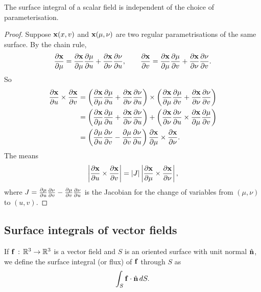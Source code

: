 \documentclass[10pt, a4paper]{article}
\begin{document}
\begin{proposition}\label{prep:mathmethII:prop:surfintscfldindpparam}
    The surface integral of a scalar field is independent of the choice of parameterisation.

    \begin{proof}
        Suppose $\mbf{x}(x, v)$ and $\mbf{x}(\mu, \nu)$ are two regular parametrisations of the same surface.
        By the chain rule,
        \[
        \frac{\partial \mbf{x}}{\partial \mu} = \frac{\partial\mbf{x}}{\partial \mu}\frac{\partial \mu}{\partial u} + \frac{\partial\mbf{x}}{\partial \nu}\frac{\partial \nu}{\partial u}, \qquad \frac{\partial\mbf{x}}{\partial v} = \frac{\partial \mbf{x}}{\partial \mu}\frac{\partial\mu}{\partial v} + \frac{\partial \mbf{x}}{\partial \nu}\frac{\partial \nu}{\partial v}.
        \]
        So
        \begin{align*}
            \frac{\partial\mbf{x}}{\partial u} \times \pd[\mbf{x}]{v} &= \left(\frac{\partial\mbf{x}}{\partial \mu}\frac{\partial \mu}{\partial u} + \frac{\partial\mbf{x}}{\partial \nu}\frac{\partial \nu}{\partial u}\right) \times \left(\frac{\partial \mbf{x}}{\partial \mu}\frac{\partial\mu}{\partial v} + \frac{\partial \mbf{x}}{\partial \nu}\frac{\partial \nu}{\partial v}\right) \\
            &= \left(\frac{\partial\mbf{x}}{\partial \mu}\frac{\partial \mu}{\partial u} + \frac{\partial\mbf{x}}{\partial \nu}\frac{\partial \nu}{\partial u}\right) + \left(\frac{\partial \mbf{x}}{\partial \nu}\frac{\partial\nu}{\partial u} \times \frac{\partial \mbf{x}}{\partial \mu}\frac{\partial \mu}{\partial v}\right) \\
            &= \left(\pd[\mu]{u}\pd[\nu]{v} - \pd[\mu]{v}\pd[\nu]{u}\right)\pd[\mbf{x}]{\mu} \times \frac{\partial \mbf{x}}{\partial \nu}.
        \end{align*}
        The means
        \[
        \left|\frac{\partial \mbf{x}}{\partial u} \times \pd[\mbf{x}]{v}\right| = |J|\left|\pd[\mbf{x}]{\mu} \times \pd[\mbf{x}]{\nu}\right|,
        \]
        where $J = \pd[\mu]{u}\pd[\nu]{v} - \pd[\mu]{v}\pd[\nu]{u}$ is the Jacobian for the change of variables from $(\mu, \nu)$ to $(u, v)$.
    \end{proof}
\end{proposition}

\subsection{Surface integrals of vector fields}
If $\mbf{f}\,:\,\R ^ 3 \to \R ^ 3$ is a vector field and $S$ is an oriented surface with unit normal $\hat{\mbf{n}}$,
we define the surface integral
(or flux)
of $\mbf{f}$ through $S$ as
\[
\int_{S}\mbf{f}\cdot\hat{\mbf{n}}\,dS.
\]
\end{document}
